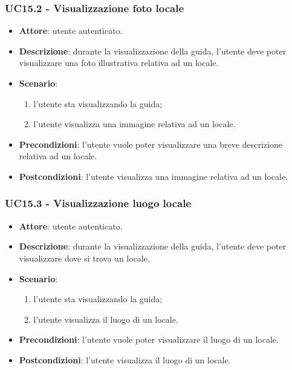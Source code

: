 \subsubsection{UC15.2 - Visualizzazione foto locale}
\begin{itemize}
    \item \textbf{Attore}: utente autenticato.
    \item \textbf{Descrizione}: durante la visualizzazione della guida, l'utente deve poter visualizzare una foto illustrativa relativa ad un locale.
    \item \textbf{Scenario}:
    \begin{enumerate}
        \item l'utente sta visualizzando la guida;
        \item l'utente visualizza una immagine relativa ad un locale.
    \end{enumerate}
    \item \textbf{Precondizioni}: l'utente vuole poter visualizzare una breve descrizione relativa ad un locale.
    \item \textbf{Postcondizioni}: l'utente visualizza una immagine relativa ad un locale.
\end{itemize}

\subsubsection{UC15.3 - Visualizzazione luogo locale}
\begin{itemize}
    \item \textbf{Attore}: utente autenticato.
    \item \textbf{Descrizione}: durante la visualizzazione della guida, l'utente deve poter visualizzare dove si trova un locale.
    \item \textbf{Scenario}:
    \begin{enumerate}
        \item l'utente sta visualizzando la guida;
        \item l'utente visualizza il luogo di un locale.
    \end{enumerate}
    \item \textbf{Precondizioni}: l'utente vuole poter visualizzare il luogo di un locale.
    \item \textbf{Postcondizioni}: l'utente visualizza il luogo di un locale.
\end{itemize}

